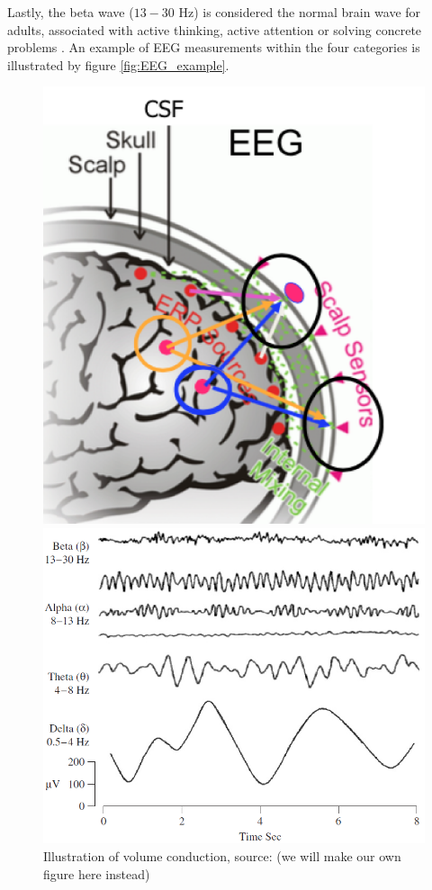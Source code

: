 Lastly, the beta wave ($13-30$ Hz) is considered the normal brain wave for adults, associated with active thinking, active attention or solving concrete problems \cite[p. 11]{EEGsignalprocessing}. 
An example of EEG measurements within the four categories is illustrated by figure \ref{fig:EEG_example}.        
\begin{figure}[H]
    \begin{minipage}[t]{.45\textwidth}
        \centering
        \includegraphics[width=\textwidth]{figurs/scalp.png}
        \caption{Illustration of volume conduction, source: \cite{phd2015}(we will make our own figure here instead)}\label{fig:volumeconduction}
    \end{minipage} 
    \hfill
    \begin{minipage}[t]{.45\textwidth}
        \centering
        \includegraphics[width=\textwidth]{figurs/EEG_example.png}

\end{minipage}
\end{figure}
